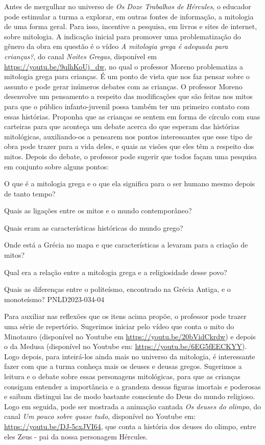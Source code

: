 \documentclass[11pt]{extarticle}
\begin{document}
Antes de mergulhar no universo de \textit{Os Doze Trabalhos de Hércules}, o educador pode estimular a turma a explorar, em outras fontes de informação, a mitologia de uma forma geral. Para isso, incentive a pesquisa, em livros e sites de internet, sobre mitologia. A indicação inicial para promover uma problematização do gênero da obra em questão é o vídeo \textit{A mitologia grega é adequada para crianças?}, do canal \textit{Noites Gregas}, disponível em \url{https://youtu.be/9qlhKoUj_dw}, no qual o professor Moreno problematiza a mitologia grega para crianças. É um ponto de vista que nos faz pensar sobre o assunto e pode gerar inúmeros debates com as crianças. O professor Moreno desenvolve um pensamento a respeito das modificações que são feitas nos mitos para que o público infanto-juvenil possa também ter um primeiro contato com essas histórias. Proponha que as crianças se sentem em forma de círculo com suas carteiras para que aconteça um debate acerca do que esperam das histórias mitológicas, auxiliando-os a pensarem nos pontos interessantes que esse tipo de obra pode trazer para a vida deles, e quais as visões que eles têm a respeito dos mitos. Depois do debate, o professor pode sugerir que todos façam uma pesquisa em conjunto sobre alguns pontos:


\item O que é a mitologia grega e o que ela significa para o ser humano mesmo depois de tanto tempo?
\item Quais as ligações entre os mitos e o mundo contemporâneo?
\item Quais eram as características históricas do mundo grego?
\item Onde está a Grécia no mapa e que características a levaram para a criação de mitos?
\item Qual era a relação entre a mitologia grega e a religiosidade desse povo?
\item Quais as diferenças entre o politeísmo, encontrado na Grécia Antiga, e o monoteísmo? PNLD2023-034-04



Para auxiliar nas reflexões que os itens acima propõe, o professor pode trazer uma série de repertório. Sugerimos iniciar pelo vídeo que conta o mito do Minotauro (disponível no Youtube em \url{https://youtu.be/20bVidCkrdw}) e depois o da Medusa (disponível no Youtube em: \url{https://youtu.be/6EG5fEECKYY}). Logo depois, para inteirá-los ainda mais no universo da mitologia, é interessante fazer com que a turma conheça mais os deuses e deusas gregos. Sugerimos a leitura e o debate sobre essas personagens mitológicas, para que as crianças consigam entender a importância e a grandeza dessas figuras imortais e poderosas e saibam distingui las de modo bastante consciente do Deus do mundo religioso. Logo em seguida, pode ser mostrada a animação cantada \textit{Os deuses do olimpo}, do canal \textit{Um pouco sobre quase tudo}, disponível no Youtube em: \url{https://youtu.be/DJ-5cxJVI64}, que conta a história dos deuses do olimpo, entre eles Zeus - pai da nossa personagem Hércules. 
\end{document}
